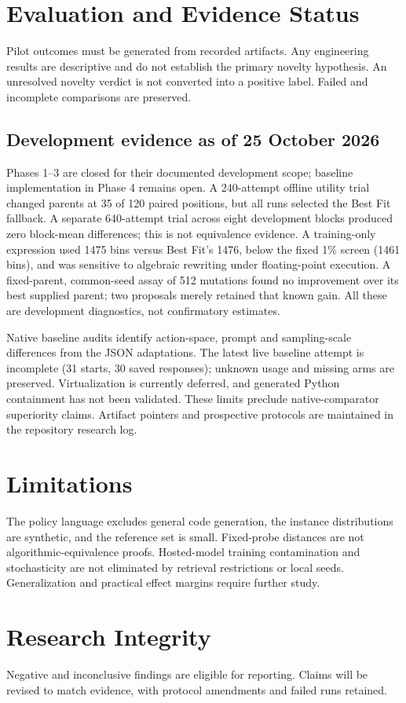\documentclass[11pt,a4paper]{article}
\begin{document}
\section{Evaluation and Evidence Status}
Pilot outcomes must be generated from recorded artifacts. Any engineering results are descriptive and do not establish the primary novelty hypothesis. An unresolved novelty verdict is not converted into a positive label. Failed and incomplete comparisons are preserved.
\subsection{Development evidence as of 25 October 2026}
Phases 1--3 are closed for their documented development scope; baseline implementation
in Phase 4 remains open. A 240-attempt offline utility trial changed parents at 35 of
120 paired positions, but all runs selected the Best Fit fallback. A separate 640-attempt
trial across eight development blocks produced zero block-mean differences; this is
not equivalence evidence. A training-only expression used 1475 bins versus Best Fit's
1476, below the fixed 1\% screen (1461 bins), and was sensitive to algebraic rewriting
under floating-point execution. A fixed-parent, common-seed assay of 512 mutations
found no improvement over its best supplied parent; two proposals merely retained that
known gain. All these are development diagnostics, not confirmatory estimates.

Native baseline audits identify action-space, prompt and sampling-scale differences
from the JSON adaptations. The latest live baseline attempt is incomplete (31 starts,
30 saved responses); unknown usage and missing arms are preserved. Virtualization is
currently deferred, and generated Python containment has not been validated. These
limits preclude native-comparator superiority claims. Artifact pointers and prospective
protocols are maintained in the repository research log.
\section{Limitations}
The policy language excludes general code generation, the instance distributions are synthetic, and the reference set is small. Fixed-probe distances are not algorithmic-equivalence proofs. Hosted-model training contamination and stochasticity are not eliminated by retrieval restrictions or local seeds. Generalization and practical effect margins require further study.
\section{Research Integrity}
Negative and inconclusive findings are eligible for reporting. Claims will be revised to match evidence, with protocol amendments and failed runs retained.


\end{document}
